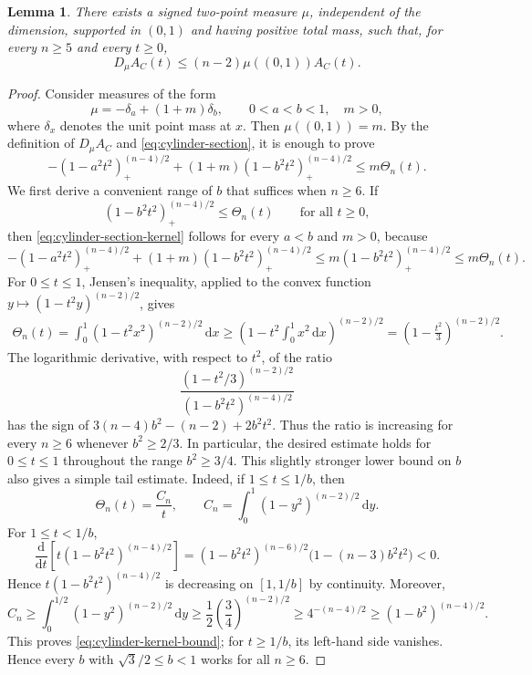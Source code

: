\documentclass[10pt,a4paper]{amsart}
\newtheorem{lemma}{Lemma}
\newcommand{\dd}{\,\mathrm{d}}
\newcommand{\pos}[1]{(#1)_{+}}
\begin{document}
\begin{lemma}\label{lem:cylinder-section}
There exists a signed two-point measure $\mu$, independent of the
dimension, supported in $(0,1)$ and having positive total mass, such that,
for every $n\geq5$ and every $t\geq0$,
\[
 D_\mu A_C(t)\leq(n-2)\mu((0,1))A_C(t).
\]
\end{lemma}

\begin{proof}
Consider measures of the form
\[
 \mu=-\delta_a+(1+m)\delta_b,
 \qquad 0<a<b<1,\quad m>0,
\]
where $\delta_x$ denotes the unit point mass at $x$.  Then
$\mu((0,1))=m$.  By the definition of
$D_\mu A_C$ and \eqref{eq:cylinder-section}, it is enough to prove
\begin{equation}\label{eq:cylinder-section-kernel}
 -\pos{1-a^2t^2}^{(n-4)/2}
 +(1+m)\pos{1-b^2t^2}^{(n-4)/2}
 \leq m\Theta_n(t).
\end{equation}
We first derive a convenient range of $b$ that suffices when $n\geq6$.  If
\begin{equation}\label{eq:cylinder-kernel-bound}
 \pos{1-b^2t^2}^{(n-4)/2}\leq \Theta_n(t)
 \qquad\text{for all }t\geq0,
\end{equation}
then \eqref{eq:cylinder-section-kernel} follows for every $a<b$ and $m>0$,
because
\[
-\pos{1-a^2t^2}^{(n-4)/2}
   +(1+m)\pos{1-b^2t^2}^{(n-4)/2}
\leq m\pos{1-b^2t^2}^{(n-4)/2}
 \leq m\Theta_n(t).
\]
For $0\leq t\leq1$, Jensen's inequality, applied to the convex function
$y\mapsto(1-t^2y)^{(n-2)/2}$, gives
\[
 \begin{aligned}
 \Theta_n(t)
 =\int_0^1(1-t^2x^2)^{(n-2)/2}\dd x\geq
 \left(1-t^2\int_0^1x^2\dd x\right)^{(n-2)/2}
 =\left(1-\frac{t^2}{3}\right)^{(n-2)/2}.
 \end{aligned}
\]
The logarithmic derivative, with respect
to $t^2$, of the ratio
\[
 \frac{(1-t^2/3)^{(n-2)/2}}
      {(1-b^2t^2)^{(n-4)/2}}
\]
has the sign of $
 3(n-4)b^2-(n-2)+2b^2t^2.$ 
Thus the ratio is increasing for every $n\geq6$ whenever $b^2\geq2/3$.
In particular, the desired estimate holds for $0\leq t\leq1$ throughout
the range $b^2\geq3/4$.  This slightly stronger
lower bound on $b$ also gives a simple tail estimate.  Indeed, if
$1\leq t\leq1/b$, then
\[
 \Theta_n(t)=\frac{C_n}{t},\qquad
 C_n=\int_0^1(1-y^2)^{(n-2)/2}\dd y.
\]
For $1\leq t<1/b$,
\[
 \frac{\mathrm d}{\mathrm dt}
 \left[t(1-b^2t^2)^{(n-4)/2}\right]
 =
 (1-b^2t^2)^{(n-6)/2}
 \bigl(1-(n-3)b^2t^2\bigr)<0.
\]
Hence $t(1-b^2t^2)^{(n-4)/2}$ is decreasing on
$[1,1/b]$ by continuity. Moreover,
\[
 C_n\geq\int_0^{1/2}(1-y^2)^{(n-2)/2}\dd y
 \geq\frac12\left(\frac34\right)^{(n-2)/2}
 \geq4^{-(n-4)/2}\geq(1-b^2)^{(n-4)/2}.
\]
This proves \eqref{eq:cylinder-kernel-bound}; for $t\geq1/b$, its left-hand
side vanishes.  Hence every $b$ with $\sqrt3/2\leq b<1$ works for all
$n\geq6$.


\end{proof}
\end{document}
